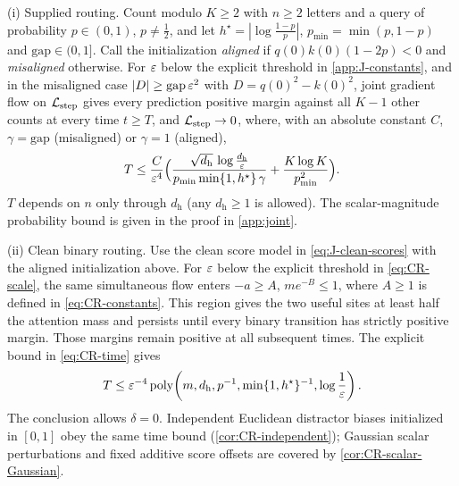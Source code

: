 \begin{theorem}
\label{thm:joint}
\textnormal{(i) Supplied routing.} Count modulo $K\ge2$ with $n\ge2$ letters and a query of probability $p\in(0,1)$, $p\neq\tfrac{1}{2}$, and let $h^\star=|\log\tfrac{1-p}{p}|$,
$p_{\min}=\min(p,1-p)$ and $\mathrm{gap}\in(0,1]$. Call the initialization \emph{aligned} if $q(0)k(0)(1-2p)<0$ and \emph{misaligned} otherwise.
For $\varepsilon$ below the explicit threshold in \cref{app:J-constants}, and in the misaligned case
$|D|\ge\mathrm{gap}\,\varepsilon^2$ with $D=q(0)^2-k(0)^2$, joint gradient flow on $\mathcal L_{\mathrm{step}}$ gives
every prediction positive margin against all $K-1$ other counts at every time $t\ge T$, and $\mathcal L_{\mathrm{step}}\to0$, where, with an absolute constant $C$,
$\gamma=\mathrm{gap}$ (misaligned) or $\gamma=1$ (aligned),
\[
 T\le\frac{C}{\varepsilon^4}\Bigl(\frac{\sqrt{d_{\mathrm h}}\,\log\frac{d_{\mathrm h}}{\varepsilon}}{p_{\min}\min\{1,h^\star\}\,\gamma}+\frac{K\log K}{p_{\min}^2}\Bigr).
\]
$T$ depends on $n$ only through $d_{\mathrm h}$ (any $d_{\mathrm h}\ge1$ is allowed).
The scalar-magnitude probability bound is given in the proof in \cref{app:joint}.

\textnormal{(ii) Clean binary routing.} Use the clean score model in \cref{eq:J-clean-scores} with the aligned initialization above.
For $\varepsilon$ below the explicit threshold in \cref{eq:CR-scale}, the same simultaneous flow
enters $-a\ge A$, $me^{-B}\le1$, where $A\ge1$ is defined in \cref{eq:CR-constants}.
This region gives the two useful sites at least half the attention mass and persists until every binary transition has
strictly positive margin. Those margins remain positive at all subsequent times. The explicit bound in \cref{eq:CR-time} gives
\[
 T\le\varepsilon^{-4}\operatorname{poly}\!\left(m,d_{\mathrm h},p^{-1},
 \min\{1,h^\star\}^{-1},\log\frac1{\varepsilon}\right).
\]
The conclusion allows $\delta=0$. Independent Euclidean distractor biases initialized in $[0,1]$ obey the same time bound
(\cref{cor:CR-independent}); Gaussian scalar perturbations and fixed additive score offsets are covered by \cref{cor:CR-scalar-Gaussian}.
\end{theorem}

